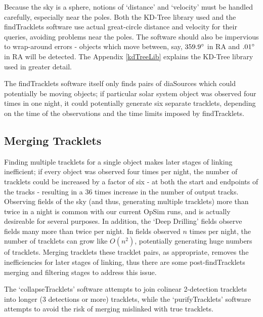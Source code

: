 Because the sky is a sphere, notions of `distance' and `velocity' must
be handled carefully, especially near the poles.  Both the KD-Tree
library used and the findTracklets software use actual great-circle
distance and velocity for their queries, avoiding problems near the
poles.  The software should also be impervious to wrap-around errors -
objects which move between, say, $359.9 \degree$ in RA and $.01
\degree$ in RA will be detected.  The Appendix \ref{kdTreeLib}
explains the KD-Tree library used in greater detail.

The findTracklets software itself only finds pairs of diaSources which
could potentially be moving objects; if particular solar system object
was observed four times in one night, it could potentially generate
six separate tracklets, depending on the time of the observations and
the time limits imposed by findTracklets. 



\subsection{Merging Tracklets} \label{collapseTracklets}

Finding multiple tracklets for a single object makes later stages of
linking inefficient; if every object was observed four times per
night, the number of tracklets could be increased by a factor of six -
at both the start and endpoints of the tracks - resulting in a 36 times
increase in the number of output tracks. Observing fields of the sky
(and thus, generating multiple tracklets) more than twice in a night
is common with our current OpSim runs, and is actually desireable for
several purposes. In addition, the `Deep Drilling' fields observe fields many
more than twice per night. In fields observed $n$ times per night, the
number of tracklets can grow like $O(n^2)$, potentially generating
huge numbers of tracklets. Merging tracklets these tracklet pairs, as
appropriate, removes the inefficiencies for later stages of linking,
thus there are some post-findTracklets merging and filtering stages to
address this issue. 

The `collapseTracklets' software 
attempts to join colinear 2-detection tracklets into longer (3
detections or more) tracklets, while the `purifyTracklets' software
attempts to avoid the risk of merging mislinked with true tracklets.

